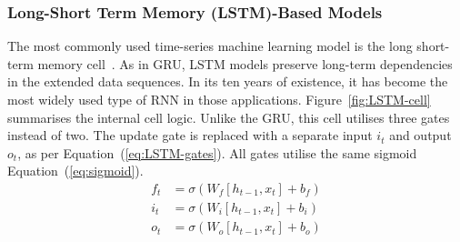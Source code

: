 %
\subsubsection{Long-Short Term Memory (LSTM)-Based Models} \label{subsub:lstm}
The most commonly used time-series machine learning model is the long short-term memory cell~\cite{LSTM_Hochreiter1997}.
As in GRU, LSTM models preserve long-term dependencies in the extended data sequences.
In its ten years of existence, it has become the most widely used type of RNN in those applications.
{\mbox{Figure~\ref{fig:LSTM-cell}} summarises the internal cell logic.}
Unlike the GRU, this cell utilises three gates instead of two.
The update gate is replaced with a separate input $i_t$ and output $o_t$, as per \mbox{Equation~(\ref{eq:LSTM-gates})}.
All gates utilise the same sigmoid \mbox{Equation~(\ref{eq:sigmoid})}.
\begin{equation}
    \begin{split}
        f_t &= \sigma \left( W_f \left[ h_{t-1}, x_t \right] + b_f \right) \\
        i_t &= \sigma \left( W_i \left[ h_{t-1}, x_t \right] + b_i \right) \\
        o_t &= \sigma \left( W_o \left[ h_{t-1}, x_t \right] + b_o \right) \\
    \end{split}
    \label{eq:LSTM-gates}
\end{equation}

